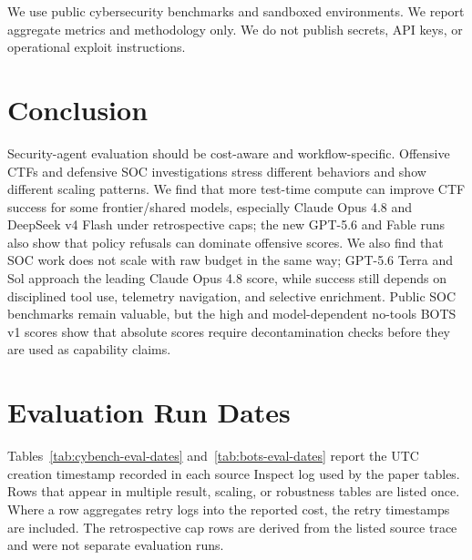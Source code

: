 \documentclass{jmlr}%
\begin{document}
We use public cybersecurity benchmarks and sandboxed environments.
We report aggregate metrics and methodology only.
We do not publish secrets, API keys, or operational exploit instructions.

\section{Conclusion}
\label{sec:conclusion}

Security-agent evaluation should be cost-aware and workflow-specific.
Offensive CTFs and defensive SOC investigations stress different behaviors and show different scaling patterns.
We find that more test-time compute can improve CTF success for some frontier/shared models, especially Claude Opus 4.8 and DeepSeek v4 Flash under retrospective caps; the new GPT-5.6 and Fable runs also show that policy refusals can dominate offensive scores.
We also find that SOC work does not scale with raw budget in the same way; GPT-5.6 Terra and Sol approach the leading Claude Opus 4.8 score, while success still depends on disciplined tool use, telemetry navigation, and selective enrichment.
Public SOC benchmarks remain valuable, but the high and model-dependent no-tools BOTS v1 scores show that absolute scores require decontamination checks before they are used as capability claims.



\appendix

\section{Evaluation Run Dates}
\label{app:evaluation-run-dates}

Tables~\ref{tab:cybench-eval-dates} and~\ref{tab:bots-eval-dates} report the UTC creation timestamp recorded in each source Inspect log used by the paper tables.
Rows that appear in multiple result, scaling, or robustness tables are listed once.
Where a row aggregates retry logs into the reported cost, the retry timestamps are included.
The retrospective cap rows are derived from the listed source trace and were not separate evaluation runs.
\end{document}
